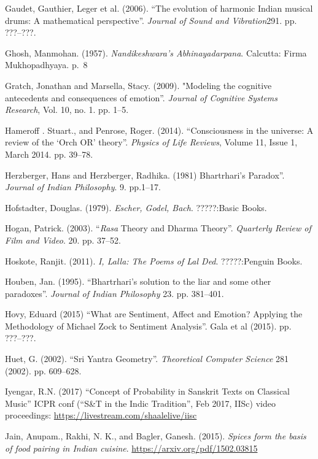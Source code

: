 \begin{thebibliography}{99}
Gaudet, Gauthier, Leger et al. (2006). “The evolution of harmonic Indian musical drums: A mathematical perspective”. \textsl{Journal of Sound and Vibration}291. pp. ???--???.

Ghosh, Manmohan. (1957). \textsl{Nandikeshwara’s Abhinayadarpana}. Calcutta: Firma Mukhopadhyaya. p.~8

Gratch, Jonathan and Marsella, Stacy. (2009). "Modeling the cognitive antecedents and consequences of emotion”. \textsl{Journal of Cognitive Systems Research}, Vol. 10, no. 1. pp. 1--5.

Hameroff . Stuart., and Penrose, Roger. (2014). “Consciousness in the universe: A review of the ‘Orch OR’ theory”. \textsl{Physics of Life Reviews}, Volume 11, Issue 1, March 2014. pp. 39--78.

Herzberger, Hans and Herzberger, Radhika. (1981) Bhartrhari’s Paradox”. \textsl{Journal of Indian Philosophy}. 9. pp.1--17.

Hofstadter, Douglas. (1979). \textsl{Escher, Godel, Bach}. ?????:Basic Books.

Hogan, Patrick. (2003). “\textsl{Rasa} Theory and Dharma Theory”. \textsl{Quarterly Review of Film and Video}. 20. pp. 37--52.

Hoskote, Ranjit. (2011). \textsl{I, Lalla: The Poems of Lal Ded}. ?????:Penguin Books.

Houben, Jan. (1995). “Bhartrhari’s solution to the liar and some other paradoxes”. \textsl{Journal of Indian Philosophy} 23. pp. 381--401.

Hovy, Eduard (2015) “What are Sentiment, Affect and Emotion? Applying the Methodology of Michael Zock to Sentiment Analysis”. Gala et al (2015). pp. ???--???.

Huet, G. (2002). “Sri Yantra Geometry”. \textsl{Theoretical Computer Science} 281 (2002). pp. 609--628.

Iyengar, R.N. (2017) “Concept of Probability in Sanskrit Texts on Classical Music” ICPR conf (“S\&T in the Indic Tradition”, Feb 2017, IISc) video proceedings: \url{https://livestream.com/shaalelive/iisc}

Jain, Anupam., Rakhi, N. K., and Bagler, Ganesh. (2015). \textsl{Spices form the basis of food pairing in Indian cuisine}. \url{https://arxiv.org/pdf/1502.03815}


\end{thebibliography}
